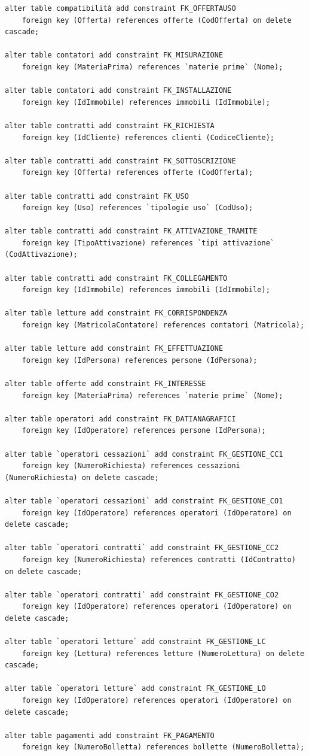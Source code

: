 \documentclass[a4paper,12pt]{report}
\begin{document}
\begin{lstlisting}
alter table compatibilità add constraint FK_OFFERTAUSO
    foreign key (Offerta) references offerte (CodOfferta) on delete cascade;
     
alter table contatori add constraint FK_MISURAZIONE
    foreign key (MateriaPrima) references `materie prime` (Nome);

alter table contatori add constraint FK_INSTALLAZIONE
    foreign key (IdImmobile) references immobili (IdImmobile);
     
alter table contratti add constraint FK_RICHIESTA
    foreign key (IdCliente) references clienti (CodiceCliente);

alter table contratti add constraint FK_SOTTOSCRIZIONE
    foreign key (Offerta) references offerte (CodOfferta);

alter table contratti add constraint FK_USO
    foreign key (Uso) references `tipologie uso` (CodUso);

alter table contratti add constraint FK_ATTIVAZIONE_TRAMITE
    foreign key (TipoAttivazione) references `tipi attivazione` (CodAttivazione);

alter table contratti add constraint FK_COLLEGAMENTO
    foreign key (IdImmobile) references immobili (IdImmobile);

alter table letture add constraint FK_CORRISPONDENZA
    foreign key (MatricolaContatore) references contatori (Matricola);
     
alter table letture add constraint FK_EFFETTUAZIONE
    foreign key (IdPersona) references persone (IdPersona);

alter table offerte add constraint FK_INTERESSE
    foreign key (MateriaPrima) references `materie prime` (Nome);
     
alter table operatori add constraint FK_DATIANAGRAFICI
    foreign key (IdOperatore) references persone (IdPersona);
    
alter table `operatori cessazioni` add constraint FK_GESTIONE_CC1
    foreign key (NumeroRichiesta) references cessazioni (NumeroRichiesta) on delete cascade;
    
alter table `operatori cessazioni` add constraint FK_GESTIONE_CO1
    foreign key (IdOperatore) references operatori (IdOperatore) on delete cascade;

alter table `operatori contratti` add constraint FK_GESTIONE_CC2
    foreign key (NumeroRichiesta) references contratti (IdContratto) on delete cascade;
    
alter table `operatori contratti` add constraint FK_GESTIONE_CO2
    foreign key (IdOperatore) references operatori (IdOperatore) on delete cascade;

alter table `operatori letture` add constraint FK_GESTIONE_LC
    foreign key (Lettura) references letture (NumeroLettura) on delete cascade;
    
alter table `operatori letture` add constraint FK_GESTIONE_LO
    foreign key (IdOperatore) references operatori (IdOperatore) on delete cascade;

alter table pagamenti add constraint FK_PAGAMENTO
    foreign key (NumeroBolletta) references bollette (NumeroBolletta);
\end{lstlisting}
\end{document}

